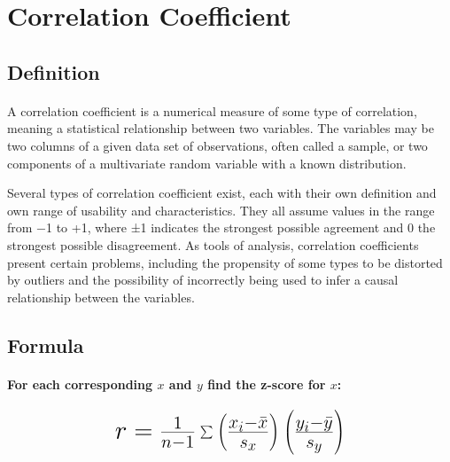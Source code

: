 \documentclass[12pt]{article}
\newcommand*{\mH}[1]{\mbox{\huge$#1$}}
\begin{document}

\section*{Correlation Coefficient}

\subsection*{Definition}
\paragraph{}%
A correlation coefficient is a numerical measure of some type of correlation, meaning a statistical relationship between two variables. The variables may be two columns of a given data set of observations, often called a sample, or two components of a multivariate random variable with a known distribution.

Several types of correlation coefficient exist, each with their own definition and own range of usability and characteristics. They all assume values in the range from −1 to +1, where ±1 indicates the strongest possible agreement and 0 the strongest possible disagreement. As tools of analysis, correlation coefficients present certain problems, including the propensity of some types to be distorted by outliers and the possibility of incorrectly being used to infer a causal relationship between the variables.

\subsection*{Formula}
\paragraph{For each corresponding $x$ and $y$ find the z-score for $x$:}
\begin{equation}
	\mH{%
		r = \frac{1}{n - 1}\sum
		\left(\frac{x_{i} - \bar{x}}{s_{x}}\right)
		\left(\frac{y_{i} - \bar{y}}{s_{y}}\right)
	}
\end{equation}%
\end{document}
